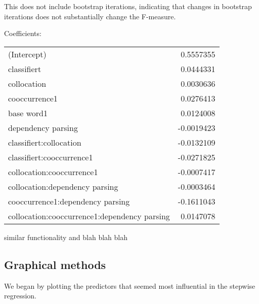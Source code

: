 \documentclass{article}
\begin{document}
This does not include bootstrap iterations, indicating that changes
in bootstrap iterations does not substantially change the F-measure.



Coefficients:

\begin{tabular}{l r}
                                (Intercept) & 0.5557355 \\
                                classifiert & 0.0444331  \\
                                 collocation & 0.0030636  \\
                              cooccurrence1 & 0.0276413 \\
                                 base word1 & 0.0124008  \\
                         dependency parsing & -0.0019423 \\
                     classifiert:collocation & -0.0132109 \\
                  classifiert:cooccurrence1 & -0.0271825 \\
                   collocation:cooccurrence1 & -0.0007417 \\
              collocation:dependency parsing & -0.0003464 \\
           cooccurrence1:dependency parsing & -0.1611043 \\
collocation:cooccurrence1:dependency parsing & 0.0147078  \\
\end{tabular}


similar functionality and blah blah blah

\subsection{Graphical methods}
We began by plotting the predictors that seemed most influential in the
stepwise regression.

\end{document}
